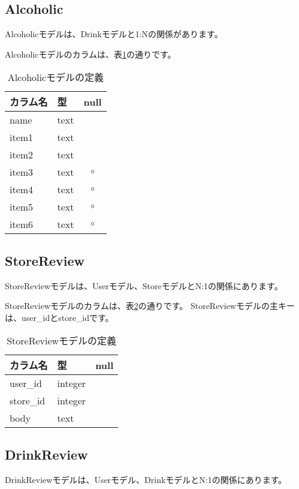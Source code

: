 \documentclass[a4j,titlepage]{jarticle}
\begin{document}
\subsection{Alcoholic}
Alcoholicモデルは、Drinkモデルと1:Nの関係があります。

Alcoholicモデルのカラムは、表\ref{alcoholic}の通りです。

\begin{table}[!htbp]
\caption{Alcoholicモデルの定義}
\label{alcoholic}
\small
\begin{center}
\begin{tabular}{|l|l|c|}\hline
カラム名 & 型 & null \\\hline\hline
name & text &  \\\hline
item1 & text & \\\hline
item2 & text & \\\hline
item3 & text & $\circ$ \\\hline
item4 & text & $\circ$ \\\hline
item5 & text & $\circ$ \\\hline
item6 & text & $\circ$ \\\hline
\end{tabular}
\end{center}
\end{table}

\subsection{StoreReview}
StoreReviewモデルは、Userモデル、StoreモデルとN:1の関係にあります。

StoreReviewモデルのカラムは、表\ref{store_review}の通りです。
StoreReviewモデルの主キーは、user\_idとstore\_idです。

\begin{table}[!htbp]
\caption{StoreReviewモデルの定義}
\label{store_review}
\small
\begin{center}
\begin{tabular}{|l|l|c|}\hline
カラム名 & 型 & null \\\hline\hline
user\_id & integer & \\\hline
store\_id & integer & \\\hline
body & text & \\\hline
\end{tabular}
\end{center}
\end{table}

\subsection{DrinkReview}
DrinkReviewモデルは、Userモデル、DrinkモデルとN:1の関係にあります。
\end{document}

